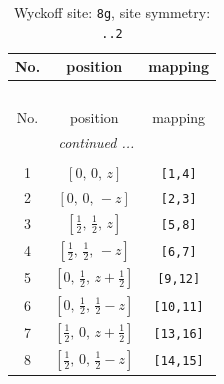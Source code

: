 \documentclass[fleqn,8pt]{jsarticle}
\begin{document}
\begin{longtable}{ccc}
\caption{Wyckoff site: {\tt 8g}, site symmetry: {\tt ..2}}
 \\
 \hline \hline
No. & position & mapping \\ \hline \endfirsthead

\multicolumn{2}{l}{\tablename\ \thetable{}} \\
 \hline \hline
No. & position & mapping \\ \hline \endhead

 \hline \hline
\multicolumn{2}{r}{\footnotesize\it continued ...} \\ \endfoot

 \hline \hline
\multicolumn{2}{r}{} \\ \endlastfoot

1 & $\left[ 0,\, 0,\, z \right]$ & {\tt [1,4]} \\ \hline
2 & $\left[ 0,\, 0,\, - z \right]$ & {\tt [2,3]} \\ \hline
3 & $\left[ \frac{1}{2},\, \frac{1}{2},\, z \right]$ & {\tt [5,8]} \\ \hline
4 & $\left[ \frac{1}{2},\, \frac{1}{2},\, - z \right]$ & {\tt [6,7]} \\ \hline
5 & $\left[ 0,\, \frac{1}{2},\, z + \frac{1}{2} \right]$ & {\tt [9,12]} \\ \hline
6 & $\left[ 0,\, \frac{1}{2},\, \frac{1}{2} - z \right]$ & {\tt [10,11]} \\ \hline
7 & $\left[ \frac{1}{2},\, 0,\, z + \frac{1}{2} \right]$ & {\tt [13,16]} \\ \hline
8 & $\left[ \frac{1}{2},\, 0,\, \frac{1}{2} - z \right]$ & {\tt [14,15]} \\
\end{longtable}
\renewcommand{\arraystretch}{1.2}
\end{document}

